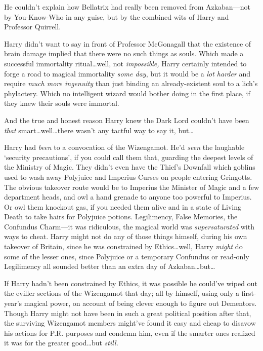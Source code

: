 He couldn’t explain how Bellatrix had really been removed from Azkaban—not by You-Know-Who in any guise, but by the combined wits of Harry and Professor Quirrell.

Harry didn’t want to say in front of Professor McGonagall that the existence of brain damage implied that there were no such things as souls. Which made a successful immortality ritual…well, not \emph{impossible,} Harry certainly intended to forge a road to magical immortality \emph{some day}, but it would be a \emph{lot harder} and require \emph{much more ingenuity} than just binding an already-existent soul to a lich’s phylactery. Which no intelligent wizard would bother doing in the first place, if they knew their souls were immortal.

And the true and honest reason Harry knew the Dark Lord couldn’t have been \emph{that} smart…well…there wasn’t any tactful way to say it, but…

Harry had \emph{been} to a convocation of the Wizengamot. He’d \emph{seen} the laughable ‘security precautions’, if you could call them that, guarding the deepest levels of the Ministry of Magic. They didn’t even have the Thief’s Downfall which goblins used to wash away Polyjuice and Imperius Curses on people entering Gringotts. The obvious takeover route would be to Imperius the Minister of Magic and a few department heads, and owl a hand grenade to anyone too powerful to Imperius. Or owl them knockout gas, if you needed them alive and in a state of Living Death to take hairs for Polyjuice potions. Legilimency, False Memories, the Confundus Charm—it was ridiculous, the magical world was \emph{supersaturated} with ways to cheat. Harry might not do any of those things himself, during his own takeover of Britain, since he was constrained by Ethics…well, Harry \emph{might} do some of the lesser ones, since Polyjuice or a temporary Confundus or read-only Legilimency all sounded better than an extra day of Azkaban…but…

If Harry hadn’t been constrained by Ethics, it was possible he could’ve wiped out the eviller sections of the Wizengamot that day; all by himself, using only a first-year’s magical power, on account of being clever enough to figure out Dementors. Though Harry might not have been in such a great political position after that, the surviving Wizengamot members might’ve found it easy and cheap to disavow his actions for P.R. purposes and condemn him, even if the smarter ones realized it was for the greater good…but \emph{still.}

